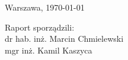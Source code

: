 \documentclass{article}
\begin{document}
\begin{flushright}
	Warszawa, \today\\
\end{flushright}



\begin{flushright}
	Raport sporządzili:\\
	dr hab. inż. Marcin Chmielewski\\
	mgr inż. Kamil Kaszyca\\
\end{flushright}
\end{document}
